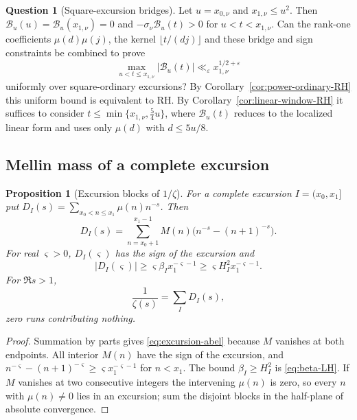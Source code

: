 \documentclass[11pt]{amsart}
\numberwithin{equation}{section}
\theoremstyle{plain}
\newtheorem{proposition}[theorem]{Proposition}
\theoremstyle{definition}
\newtheorem{question}[theorem]{Question}
\theoremstyle{remark}
\newcommand{\eps}{\varepsilon}
\begin{document}
\begin{question}[Square-excursion bridges]
\label{q:excursion-constraint}
Let $u=x_{0,\nu}$ and $x_{1,\nu}\le u^2$. Then
$\mathcal B_u(u)=\mathcal B_u(x_{1,\nu})=0$ and
$-\sigma_\nu\mathcal B_u(t)>0$ for $u<t<x_{1,\nu}$. Can the rank-one
coefficients $\mu(d)\mu(j)$, the kernel $\lfloor t/(dj)\rfloor$ and these
bridge and sign constraints be combined to prove
\[
\max_{u<t\le x_{1,\nu}}|\mathcal B_u(t)|
\ll_\eps x_{1,\nu}^{1/2+\eps}
\]
uniformly over square-ordinary excursions? By
Corollary~\ref{cor:power-ordinary-RH} this uniform bound is equivalent to
RH. By Corollary~\ref{cor:linear-window-RH} it suffices to consider
$t\le\min\{x_{1,\nu},\frac54u\}$, where $\mathcal B_u(t)$ reduces to
the localized linear form and uses only $\mu(d)$ with $d\le5u/8$.
\end{question}

\subsection{Mellin mass of a complete excursion}

\begin{proposition}[Excursion blocks of $1/\zeta$]
\label{prop:excursion-mellin}
For a complete excursion $I=(x_0,x_1]$ put
$D_I(s)=\sum_{x_0<n\le x_1}\mu(n)n^{-s}$. Then
\begin{equation}
\label{eq:excursion-abel}
D_I(s)=\sum_{n=x_0+1}^{x_1-1}M(n)
\bigl(n^{-s}-(n+1)^{-s}\bigr).
\end{equation}
For real $\varsigma>0$, $D_I(\varsigma)$ has the sign of the excursion and
\begin{equation}
\label{eq:excursion-mass-lower}
|D_I(\varsigma)|\ge
\varsigma\beta_I x_1^{-\varsigma-1}
\ge\varsigma H_I^2x_1^{-\varsigma-1}.
\end{equation}
For $\Re s>1$,
\begin{equation}
\label{eq:1overzeta-excursions}
\frac1{\zeta(s)}=\sum_I D_I(s),
\end{equation}
zero runs contributing nothing.
\end{proposition}

\begin{proof}
Summation by parts gives \eqref{eq:excursion-abel} because $M$ vanishes at
both endpoints. All interior $M(n)$ have the sign of the excursion, and
$n^{-\varsigma}-(n+1)^{-\varsigma}\ge\varsigma x_1^{-\varsigma-1}$ for $n<x_1$. The
bound $\beta_I\ge H_I^2$ is \eqref{eq:beta-LH}. If $M$ vanishes at two
consecutive integers the intervening $\mu(n)$ is zero, so every $n$ with
$\mu(n)\ne0$ lies in an excursion; sum the disjoint blocks in the
half-plane of absolute convergence.
\end{proof}
\end{document}
